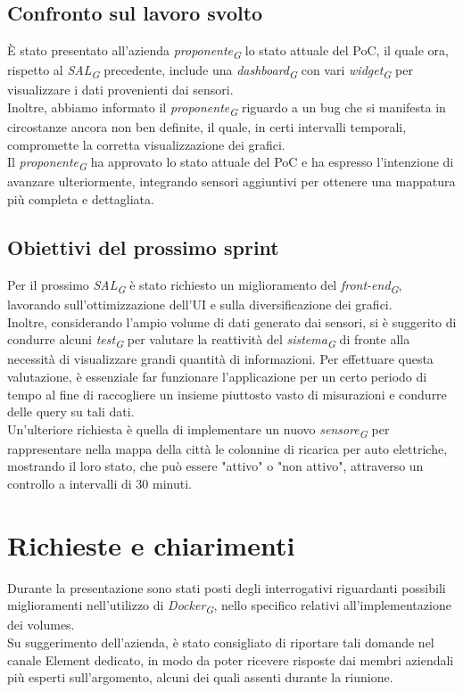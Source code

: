 \documentclass{article}
\begin{document}
    \subsection{Confronto sul lavoro svolto}
    È stato presentato all'azienda \textit{proponente}\textsubscript{\textit{G}} lo stato attuale del PoC, il quale ora, rispetto al \textit{SAL}\textsubscript{\textit{G}} precedente, include una \textit{dashboard}\textsubscript{\textit{G}} con vari \textit{widget}\textsubscript{\textit{G}} per visualizzare i dati provenienti dai sensori.\\
    Inoltre, abbiamo informato il \textit{proponente}\textsubscript{\textit{G}} riguardo a un bug che si manifesta in circostanze ancora non ben definite, il quale, in certi intervalli temporali, compromette la corretta visualizzazione dei grafici.\\
    Il \textit{proponente}\textsubscript{\textit{G}} ha approvato lo stato attuale del PoC e ha espresso l'intenzione di avanzare ulteriormente, integrando sensori aggiuntivi per ottenere una mappatura più completa e dettagliata.

    \subsection{Obiettivi del prossimo sprint}
    Per il prossimo \textit{SAL}\textsubscript{\textit{G}} è stato richiesto un miglioramento del \textit{front-end}\textsubscript{\textit{G}}, lavorando sull'ottimizzazione dell'UI e sulla diversificazione dei grafici.\\
    Inoltre, considerando l'ampio volume di dati generato dai sensori, si è suggerito di condurre alcuni \textit{test}\textsubscript{\textit{G}} per valutare la reattività del \textit{sistema}\textsubscript{\textit{G}} di fronte alla necessità di visualizzare grandi quantità di informazioni. Per effettuare questa valutazione, è essenziale far funzionare l'applicazione per un certo periodo di tempo al fine di raccogliere un insieme piuttosto vasto di misurazioni e condurre delle query su tali dati.\\
    Un'ulteriore richiesta è quella di implementare un nuovo \textit{sensore}\textsubscript{\textit{G}} per rappresentare nella mappa della città le colonnine di ricarica per auto elettriche, mostrando il loro stato, che può essere "attivo" o "non attivo", attraverso un controllo a intervalli di 30 minuti. 

\section{Richieste e chiarimenti}
    Durante la presentazione sono stati posti degli interrogativi riguardanti possibili miglioramenti nell'utilizzo di \textit{Docker}\textsubscript{\textit{G}}, nello specifico relativi all'implementazione dei volumes. \\
    Su suggerimento dell'azienda, è stato consigliato di riportare tali domande nel canale Element dedicato, in modo da poter ricevere risposte dai membri aziendali più esperti sull'argomento, alcuni dei quali assenti durante la riunione.  
\end{document}
